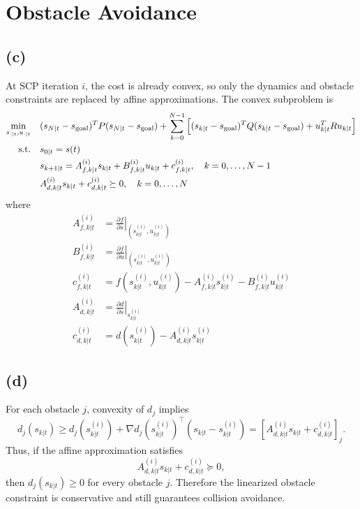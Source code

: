 \section{Obstacle Avoidance}

\subsection*{(c)}
At SCP iteration \(i\), the cost is already convex, so only the dynamics and
obstacle constraints are replaced by affine approximations. The convex
subproblem is
\[
\begin{aligned}
\min_{s_{\cdot|t},u_{\cdot|t}}\quad
& (s_{N|t}-s_{\rm goal})^TP(s_{N|t}-s_{\rm goal})
+ \sum_{k=0}^{N-1}
\left[
(s_{k|t}-s_{\rm goal})^TQ(s_{k|t}-s_{\rm goal})
+ u_{k|t}^TRu_{k|t}
\right] \\
\text{s.t.}\quad
& s_{0|t}=s(t) \\
& s_{k+1|t}
= A_{f,k|t}^{(i)}s_{k|t}
+ B_{f,k|t}^{(i)}u_{k|t}
+ c_{f,k|t}^{(i)},
\quad k=0,\ldots,N-1 \\
& A_{d,k|t}^{(i)}s_{k|t}
+ c_{d,k|t}^{(i)} \succeq 0,
\quad k=0,\ldots,N
\end{aligned}
\]
where
\[
\begin{aligned}
A_{f,k|t}^{(i)}
&=
\left.\frac{\partial f}{\partial s}\right|_
{(s_{k|t}^{(i)},u_{k|t}^{(i)})} \\
B_{f,k|t}^{(i)}
&=
\left.\frac{\partial f}{\partial u}\right|_
{(s_{k|t}^{(i)},u_{k|t}^{(i)})} \\
c_{f,k|t}^{(i)}
&=
f(s_{k|t}^{(i)},u_{k|t}^{(i)})
- A_{f,k|t}^{(i)}s_{k|t}^{(i)}
- B_{f,k|t}^{(i)}u_{k|t}^{(i)} \\
A_{d,k|t}^{(i)}
&=
\left.\frac{\partial d}{\partial s}\right|_{s_{k|t}^{(i)}} \\
c_{d,k|t}^{(i)}
&=
d(s_{k|t}^{(i)})
- A_{d,k|t}^{(i)}s_{k|t}^{(i)}
\end{aligned}
\]


\subsection*{(d)}
For each obstacle $j$, convexity of $d_j$ implies
\[
d_j(s_{k|t}) \geq d_j(s^{(i)}_{k|t})
+ \nabla d_j(s^{(i)}_{k|t})^\top (s_{k|t}-s^{(i)}_{k|t})
= [A^{(i)}_{d,k|t}s_{k|t}+c^{(i)}_{d,k|t}]_j .
\]
Thus, if the affine approximation satisfies
\[
A^{(i)}_{d,k|t}s_{k|t}+c^{(i)}_{d,k|t}\succeq 0,
\]
then $d_j(s_{k|t})\geq 0$ for every obstacle $j$. Therefore the linearized obstacle constraint is conservative and still guarantees collision avoidance.


